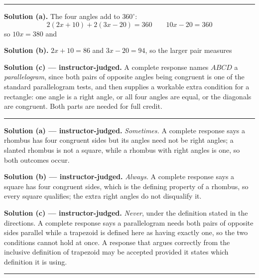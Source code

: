 \documentclass[12pt]{article}
\begin{document}
\vspace{0.15cm}\noindent\rule{\linewidth}{0.2pt}


\noindent\textbf{Solution (a).} The four angles add to $360^\circ$:
\[ 2(2x+10) + 2(3x-20) = 360 \qquad 10x - 20 = 360 \]
so $10x = 380$ and 

\noindent\textbf{Solution (b).} $2x + 10 = 86$ and $3x - 20 = 94$, so the larger
pair measures 

\noindent\textbf{Solution (c) --- instructor-judged.} A complete response names
$ABCD$ a \emph{parallelogram}, since both pairs of opposite angles being
congruent is one of the standard parallelogram tests, and then supplies a
workable extra condition for a rectangle: one angle is a right angle, or all four
angles are equal, or the diagonals are congruent. Both parts are needed for full
credit.

\vspace{0.15cm}\noindent\rule{\linewidth}{0.2pt}


\noindent\textbf{Solution (a) --- instructor-judged.} \emph{Sometimes.} A
complete response says a rhombus has four congruent sides but its angles need not
be right angles; a slanted rhombus is not a square, while a rhombus with right
angles is one, so both outcomes occur.

\noindent\textbf{Solution (b) --- instructor-judged.} \emph{Always.} A complete
response says a square has four congruent sides, which is the defining property
of a rhombus, so every square qualifies; the extra right angles do not disqualify
it.

\noindent\textbf{Solution (c) --- instructor-judged.} \emph{Never}, under the
definition stated in the directions. A complete response says a parallelogram
needs both pairs of opposite sides parallel while a trapezoid is defined here as
having exactly one, so the two conditions cannot hold at once. A response that
argues correctly from the inclusive definition of trapezoid may be accepted
provided it states which definition it is using.

\vspace{0.15cm}\noindent\rule{\linewidth}{0.2pt}
\end{document}
